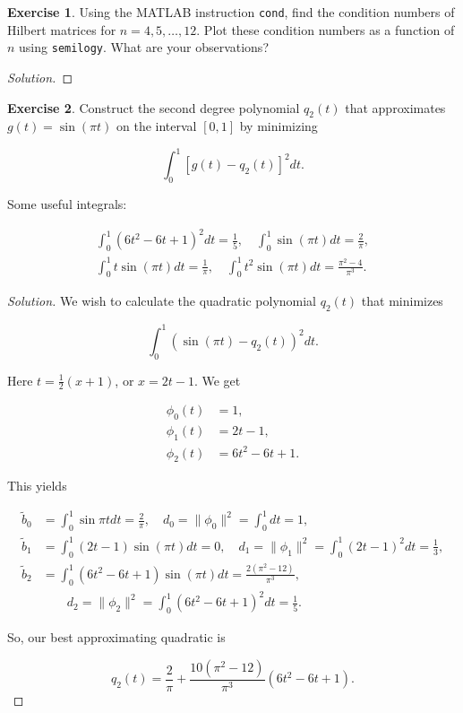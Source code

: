 \documentclass[12pt,a4]{article}
\theoremstyle{definition}
\newtheorem{exercise}{Exercise}
\begin{document}
\begin{exercise}
	Using the MATLAB instruction \texttt{cond}, find the condition numbers of Hilbert matrices for $n = 4, 5, \ldots, 12$. Plot these condition numbers as a function of $n$ using \texttt{semilogy}. What are your observations?
\end{exercise}
\begin{proof}[Solution]
	
\end{proof}

\begin{exercise}
	Construct the second degree polynomial $q_2(t)$ that approximates $g(t) = \sin(\pi t)$ on the interval $[0, 1]$ by minimizing 
	
	\[
	\int_0^1 [g(t) - q_2(t)]^2 dt {.}
	\]
	
	\noindent Some useful integrals:
	
	\begin{gather}
	\int_0^1 (6 t^2 - 6 t + 1)^2 dt = \frac{1}{5} {,} \quad \int_0^1 \sin(\pi t) dt = \frac{2}{\pi} {,} \\
	\int_0^1 t \sin(\pi t) dt = \frac{1}{\pi} {,} \quad \int_0^1 t^2 \sin(\pi t) dt = \frac{\pi^2 - 4}{\pi^3} {.}
	\end{gather}
\end{exercise}
\begin{proof}[Solution]
	We wish to calculate the quadratic polynomial $q_2(t)$ that minimizes 
	
	\[
	\int_0^1 \left( \sin(\pi t) - q_2(t) \right)^2 dt {.}
	\]
	
	\noindent Here $t = \frac{1}{2}(x + 1)$, or $x = 2 t - 1$. We get
	
	\begin{align*}
	\phi_0(t) &= 1 {,} \\
	\phi_1(t) &= 2 t - 1 {,} \\
	\phi_2(t) &= 6 t^2 - 6 t + 1 {.}
	\end{align*}
	
	\noindent This yields 
	
	\begin{align*}
	\tilde{b}_0 &= \int_0^1 \sin{\pi t} d t = \frac{2}{\pi} {,} \quad d_0 = \| \phi_0 \|^2 = \int_0^1 dt = 1 {,} \\
	\tilde{b}_1 &= \int_0^1 (2 t - 1) \sin(\pi t) dt = 0 {,} \quad d_1 = \| \phi_1 \|^2 = \int_0^1 (2 t - 1)^2 dt = \frac{1}{3} {,} \\
	\tilde{b}_2 &= \int_0^1 (6 t^2 - 6 t + 1) \sin(\pi t) dt = \frac{2(\pi^2 - 12)}{\pi^3} {,} \\
	&\qquad d_2 = \| \phi_2 \|^2 = \int_0^1 (6 t^2 - 6 t + 1)^2 dt = \frac{1}{5} {.}
	\end{align*}
	
	\noindent So, our best approximating quadratic is 
	
	\[
	q_2(t) = \frac{2}{\pi} + \frac{10(\pi^2 - 12)}{\pi^3} (6 t^2 - 6 t + 1) {.}
	\]
\end{proof}
\end{document}
